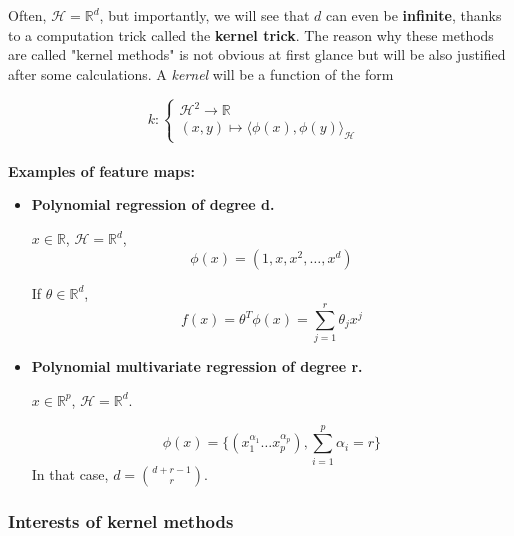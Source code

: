 \documentclass[
10pt, %
a4paper, %
oneside, %
headinclude,footinclude, %
BCOR5mm, %
]{scrartcl}
\begin{document}
Often, $ \mathcal{H} = \mathbb{R}^d $, but importantly, we will see that $d$ can even be \textbf{{infinite}}, thanks to a computation trick called the \textbf{{kernel trick}}. The reason why these methods are called "kernel methods" is not obvious at first glance but will be also justified after some calculations.  A \textit{{kernel}} will be a function of the form


$$
k  : \left\{
    \begin{array}{ll}
	\mathcal{H}^2  \rightarrow \mathbb{R}  \\
	(x,y) \mapsto \langle \phi(x), \phi(y) \rangle_{ \mathcal{H} } & 
    \end{array}
\right.
$$
\\


\textbf{{Examples of feature maps:}} 

\begin{itemize}
    \item \textbf{{Polynomial regression of degree d.}}

	$x\in \mathbb{R}$, $ \mathcal{H}  = \mathbb{R}^d$, 
	\begin{equation}
	    \phi(x) = (1, x, x^2, \dots, x^d)
	\end{equation}

	If $\theta\in \mathbb{R}^d$, 
	\begin{equation*}
	    f(x) = \theta^T\phi(x) = \sum^{r}_{j=1} \theta_jx^j
	\end{equation*}
    \item \textbf{{Polynomial multivariate regression of degree r.}}

	$x\in \mathbb{R}^p$, $ \mathcal{H}  = \mathbb{R}^d$.

	\begin{equation*}
	    \phi(x) = \{(x_1^{\alpha_1}\dots x_p^{\alpha_p}),{ \sum^{p}_{i=1} \alpha_i = r}\}
	\end{equation*}
	In that case, $d = \binom{d+r-1}{r}$.


\end{itemize}

\subsubsection{\large\color{Periwinkle}Interests of kernel methods}
\end{document}
